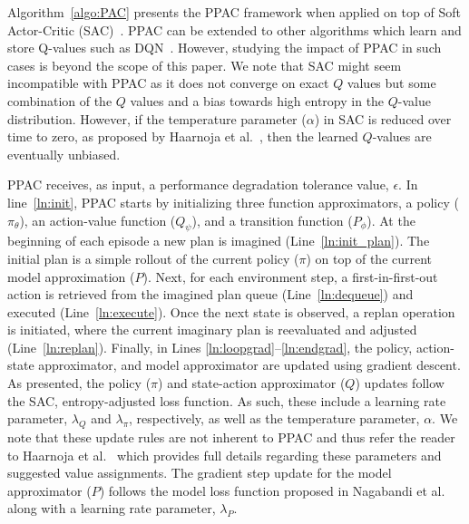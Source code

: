 \documentclass{article}
\begin{document}
        Algorithm~\ref{algo:PAC} presents the PPAC framework when applied on top of Soft Actor-Critic (SAC)~\cite{haarnoja2018soft}. PPAC can be extended to other algorithms which learn and store Q-values such as DQN~\cite{mnih2015human}. However, studying the impact of PPAC in such cases is beyond the scope of this paper. We note that SAC might seem incompatible with PPAC as it does not converge on exact $Q$ values but some combination of the $Q$ values and a bias towards high entropy in the $Q$-value distribution. However, if the temperature parameter ($\alpha$) in SAC is reduced over time to zero, as proposed by Haarnoja et al.~\citeyear{haarnoja2018soft}, then the learned $Q$-values are eventually unbiased.  

        PPAC receives, as input, a performance degradation tolerance value, $\epsilon$. In line~\ref{ln:init}, PPAC starts by initializing three function approximators, a policy ($\pi_\theta$), an action-value function ($Q_\psi$), and a transition function ($P_\phi$).  
        At the beginning of each episode a new plan is imagined (Line~\ref{ln:init_plan}). The initial plan is a simple rollout of the current policy ($\pi$) on top of the current model approximation ($P$). Next, for each environment step, a first-in-first-out action is retrieved from the imagined plan queue (Line~\ref{ln:dequeue}) and executed (Line~\ref{ln:execute}). Once the next state is observed, a replan operation is initiated, where the current imaginary plan is reevaluated and adjusted (Line~\ref{ln:replan}). Finally, in Lines \ref{ln:loopgrad}--\ref{ln:endgrad}, the policy, action-state approximator, and model approximator are updated using gradient descent. As presented, the policy ($\pi$) and state-action approximator ($Q$) updates follow the SAC, entropy-adjusted loss function. As such, these include a learning rate parameter, $\lambda_Q$ and $\lambda_\pi$, respectively, as well as the temperature parameter, $\alpha$. We note that these update rules are not inherent to PPAC and thus refer the reader to Haarnoja et al.~\citeyear{haarnoja2018soft} which provides full details regarding these parameters and suggested value assignments.
        The gradient step update for the model approximator ($P$) follows the model loss function proposed in Nagabandi et al.~\citeyear{nagabandi2018neural} along with a learning rate parameter, $\lambda_P$.    %
\end{document}
